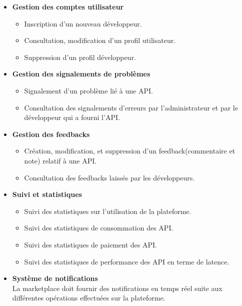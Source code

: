 \begin{itemize}
    \item \textbf{Gestion des comptes utilisateur }
          \begin{itemize}
              \item Inscription d'un nouveau développeur.
              \item Consultation, modification d’un profil utilisateur.
              \item Suppression d'un profil développeur.
          \end{itemize}
    \item \textbf{Gestion des signalements de problèmes}
          \begin{itemize}
              \item Signalement d’un problème lié à une API.
              \item Consultation des signalements d'erreurs par l’administrateur et par le développeur qui a fourni l’API.
          \end{itemize}
\pagebreak

    \item \textbf{Gestion des feedbacks}
          \begin{itemize}
              \item Création, modification, et suppression d’un feedback(commentaire et note) relatif à une API.
              \item Consultation des feedbacks laissés par les développeurs.
          \end{itemize}
    \item \textbf{Suivi et statistiques }
           \begin{itemize}
                \item Suivi des statistiques sur l'utilisation de la plateforme.
                \item Suivi des statistiques de consommation des API.
                \item Suivi des statistiques de paiement des API.
                \item Suivi des statistiques de performance des API en terme de latence.
           \end{itemize}
    \item \textbf{Système de notifications  } \\
    La marketplace doit fournir des notifications en temps réel suite aux différentes opérations effectuées sur la plateforme. 
\end{itemize}
